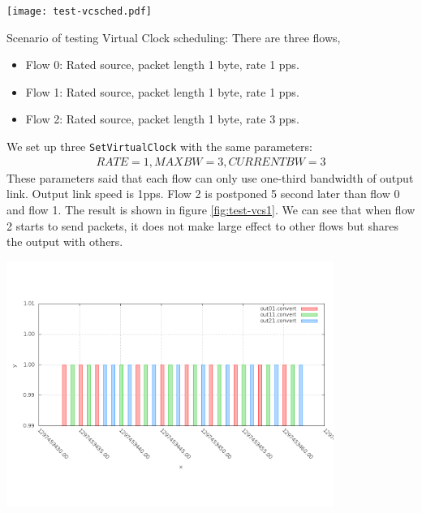\documentclass[a4paper]{article}
\begin{document}
  \begin{center}
	\texttt{[image: test-vcsched.pdf]}
	\label{fig:vcsched}
  \end{center}
  Scenario of testing Virtual Clock scheduling: There are three flows,
  \begin{itemize}
  	\item Flow 0: Rated source, packet length 1 byte, rate 1 pps.
  	\item Flow 1: Rated source, packet length 1 byte, rate 1 pps.
  	\item Flow 2: Rated source, packet length 1 byte, rate 3 pps.
  \end{itemize}
  We set up three \texttt{SetVirtualClock} with the same parameters: 
  \begin{align*}RATE = 1, MAXBW = 3, CURRENTBW = 3\end{align*} 
  These parameters said that each flow can only use one-third bandwidth of output link. Output link speed is 1pps. Flow 2 is postponed 5 second later than flow 0 and flow 1. The result is shown in figure \ref{fig:test-vcs1}. We can see that when flow 2 starts to send packets, it does not make large effect to other flows but shares the output with others.
  
  \begin{center}
	\includegraphics[width=0.80\textwidth]{vcs1-dense.png}
	\label{fig:test-vcs1}
  \end{center}
  
\end{document}
